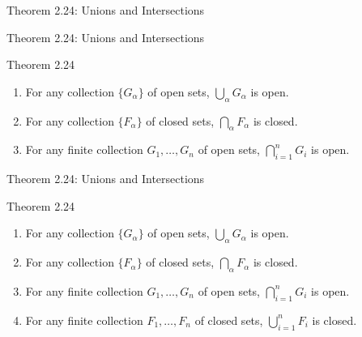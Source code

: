 \documentclass[aspectratio=169,12pt,t]{beamer}
\begin{document}
{\begin{frame}{Theorem 2.24: Unions and Intersections}
\end{frame}

\begin{frame}{Theorem 2.24: Unions and Intersections}
  \begin{thmblock}{Theorem 2.24}
    \begin{enumerate}
      \item[(a)] For any collection $\{G_\alpha\}$ of open sets,
        $\bigcup_\alpha G_\alpha$ is open.
      \item[(b)] For any collection $\{F_\alpha\}$ of closed sets,
        $\bigcap_\alpha F_\alpha$ is closed.
      \item[(c)] For any \alert{finite} collection $G_1, \dots, G_n$ of open sets,
        $\bigcap_{i=1}^n G_i$ is open.
    \end{enumerate}
  \end{thmblock}

\end{frame}

\begin{frame}{Theorem 2.24: Unions and Intersections}
  \begin{thmblock}{Theorem 2.24}
    \begin{enumerate}
      \item[(a)] For any collection $\{G_\alpha\}$ of open sets,
        $\bigcup_\alpha G_\alpha$ is open.
      \item[(b)] For any collection $\{F_\alpha\}$ of closed sets,
        $\bigcap_\alpha F_\alpha$ is closed.
      \item[(c)] For any \alert{finite} collection $G_1, \dots, G_n$ of open sets,
        $\bigcap_{i=1}^n G_i$ is open.
      \item[(d)] For any \alert{finite} collection $F_1, \dots, F_n$ of closed sets,
        $\bigcup_{i=1}^n F_i$ is closed.
    \end{enumerate}
  \end{thmblock}


\end{frame}}
\end{document}
